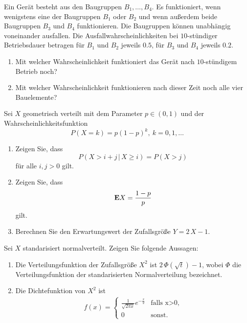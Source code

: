  Ein Gerät besteht aus den Baugruppen $B_1,\dots
,B_4$. Es funktioniert, wenn wenigstens eine der Baugruppen $B_1$ oder $B_2$
und wenn außerdem beide Baugruppen $B_3$ und $B_4$ funktionieren. Die
Baugruppen können unabhängig voneinander ausfallen. Die
Ausfallwahrscheinlichkeiten bei $10$-stündiger Betriebsdauer betragen für $B_1$
und $B_2$ jeweils $0.5$, für $B_3$ und $B_4$ jeweils $0.2$. 
\begin{enumerate}
    \item Mit welcher Wahrscheinlichkeit funktioniert das Gerät nach
        $10$-stündigem Betrieb noch?
    \item Mit welcher Wahrscheinlichkeit funktionieren nach dieser Zeit noch
        alle vier Bauelemente?
\end{enumerate}

 Sei 
$X$ geometrisch verteilt mit dem Parameter $p\in (0,1)$ und der 
Wahrscheinlichkeitsfunktion
\begin{equation*}
    P(X = k) = p(1-p)^{k}, \ k=0,1,\dots
\end{equation*}
\begin{enumerate}
    \item Zeigen Sie, dass
        \begin{equation*}
            P( X > i+j \,|\, X \geq i) = P(X > j)
        \end{equation*}
        für alle $i,j>0$ gilt.
    \item Zeigen Sie, dass 
        \begin{align*}
            \mathbf E X = \frac{1-p}{p}
        \end{align*}
        gilt.
    \item Berechnen Sie den Erwartungswert der Zufallsgröße $Y=2\,X -1$.
\end{enumerate}

 Sei $X$ 
standarisiert normalverteilt. Zeigen Sie folgende Aussagen:
\begin{enumerate}
    \item Die Verteilungsfunktion der Zufallsgröße $X^2$ ist $2\, \Phi(\sqrt{t})-1$,
        wobei $\Phi$ die Verteilungsfunktion der standarisierten Normalverteilung 
        bezeichnet.
    \item Die Dichtefunktion von $X^2$ ist 
        \begin{align*}
            f(x) = \begin{cases}
                \frac{1}{\sqrt{2 \pi x}} e^{-\frac{x}{2}} & \text{falls x>0}, \\
                0 & \text{sonst.}
            \end{cases}
        \end{align*}
\end{enumerate}

